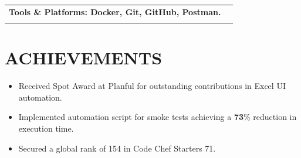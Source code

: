 \documentclass[10pt, a4paper]{article}
\makeatletter
\newcommand{\resumeSubheading}[4]{%
  \vspace{0.6mm}%
  \begin{tabular*}{0.98\textwidth}[t]{l@{\extracolsep{\fill}}r}%
      \textbf{#1} & \footnotesize{#4} \\%
    \footnotesize{#3} & \fontsize{9}{10}\selectfont#2%
  \end{tabular*}%
  \vspace{-2.4mm}%
}
\makeatother
\begin{document}
\resumeSubheading
{Tools \& Platforms: \fontsize{11.5}{11.5}\selectfont\fontseries{l}\selectfont Docker, Git, GitHub, Postman.}{}{}{}

\vspace{-5.0mm}
\section{\textbf{ACHIEVEMENTS}}

\begin{itemize}[itemsep=-4pt]
  \item Received Spot Award at Planful for outstanding contributions in Excel UI automation.
  \item Implemented automation script for smoke tests achieving a \textbf{73}\% reduction in execution time.
  \item Secured a global rank of 154 in Code Chef Starters 71.
\end{itemize}
\end{document}
